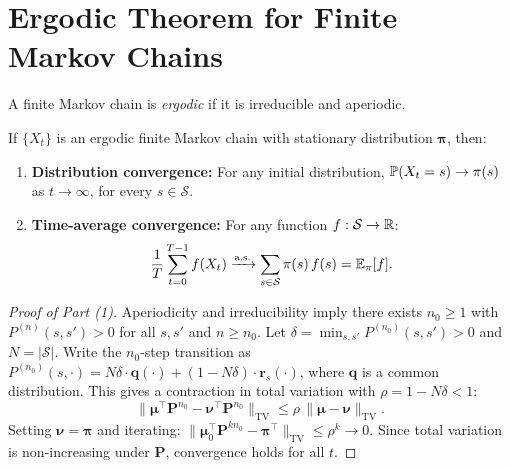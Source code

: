 \documentclass[11pt,a4paper]{article}
\begin{document}

\section{Ergodic Theorem for Finite Markov Chains}
\label{sec:ergodic}

\begin{definition}
\label{def:ergodic}
A finite Markov chain is \emph{ergodic} if it is irreducible and
aperiodic.
\end{definition}

\begin{keyresult}[title={Ergodic Theorem}]
\begin{theorem}
\label{thm:ergodic}
If $\{X_t\}$ is an ergodic finite Markov chain with stationary
distribution $\boldsymbol{\pi}$, then:
\begin{enumerate}[nosep]
  \item \textbf{Distribution convergence:}
    For any initial distribution,
    $\mathbb{P}(X_t = s) \to \pi(s)$ as $t \to \infty$, for every
    $s \in \mathcal{S}$.
  \item \textbf{Time-average convergence:}
    For any function $f: \mathcal{S} \to \mathbb{R}$:
    \begin{equation}
      \frac{1}{T}\sum_{t=0}^{T-1} f(X_t)
      \xrightarrow{\text{a.s.}} \sum_{s \in \mathcal{S}} \pi(s)\, f(s)
      = \mathbb{E}_\pi[f].
      \label{eq:ergodic}
    \end{equation}
\end{enumerate}
\end{theorem}
\end{keyresult}

\begin{proof}[Proof of Part (1)]
Aperiodicity and irreducibility imply there exists $n_0 \geq 1$
with $P^{(n)}(s, s') > 0$ for all $s, s'$ and $n \geq n_0$.
Let $\delta = \min_{s,s'} P^{(n_0)}(s, s') > 0$ and
$N = |\mathcal{S}|$.  Write the $n_0$-step transition as
$P^{(n_0)}(s, \cdot) = N\delta \cdot \boldsymbol{q}(\cdot) +
(1 - N\delta) \cdot \boldsymbol{r}_s(\cdot)$, where
$\boldsymbol{q}$ is a common distribution.  This gives a
contraction in total variation with $\rho = 1 - N\delta < 1$:
\begin{equation}
  \|\boldsymbol{\mu}^\top \mathbf{P}^{n_0}
    - \boldsymbol{\nu}^\top \mathbf{P}^{n_0}\|_{\text{TV}}
  \leq \rho\,
    \|\boldsymbol{\mu} - \boldsymbol{\nu}\|_{\text{TV}}.
\end{equation}
Setting $\boldsymbol{\nu} = \boldsymbol{\pi}$ and iterating:
$\|\boldsymbol{\mu}_0^\top \mathbf{P}^{kn_0} -
\boldsymbol{\pi}^\top\|_{\text{TV}} \leq \rho^k \to 0$.
Since total variation is non-increasing under $\mathbf{P}$,
convergence holds for all $t$.
\end{proof}
\end{document}
